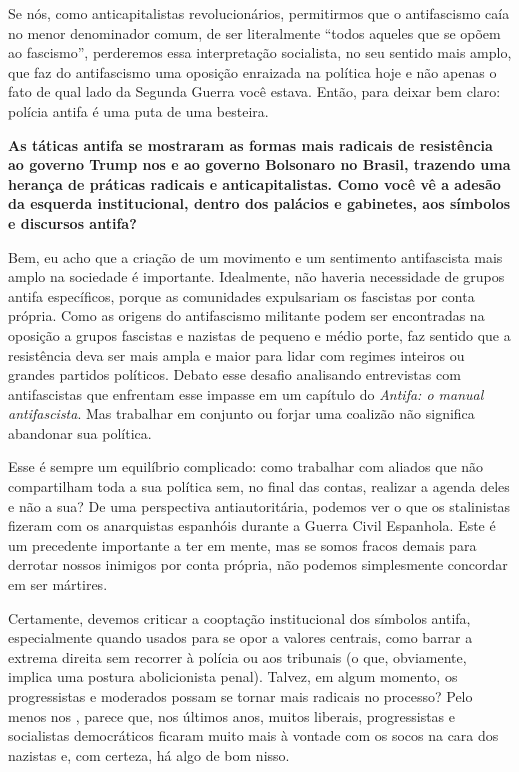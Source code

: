 Se nós, como anticapitalistas revolucionários, permitirmos que o antifascismo caía no menor denominador comum, de ser literalmente ``todos aqueles que se opõem ao fascismo'', perderemos essa interpretação socialista, no seu sentido mais amplo, que faz do antifascismo uma oposição enraizada na política hoje e não apenas o fato de qual lado da Segunda Guerra você estava. Então, para deixar bem claro: polícia antifa é uma puta de uma besteira. 

\bigskip

\noindent{}\textbf{As táticas antifa se mostraram as formas mais radicais de resistência ao governo Trump nos  e ao governo Bolsonaro no Brasil, trazendo uma herança de práticas radicais e anticapitalistas. Como você vê a adesão da esquerda institucional, dentro dos palácios e gabinetes, aos símbolos e discursos antifa?}
 
Bem, eu acho que a criação de um movimento e um sentimento antifascista mais amplo na sociedade é importante. Idealmente, não haveria necessidade de grupos antifa específicos, porque as comunidades expulsariam os fascistas por conta própria. Como as origens do antifascismo militante podem ser encontradas na oposição a grupos fascistas e nazistas de pequeno e médio porte, faz sentido que a resistência deva ser mais ampla e maior para lidar com regimes inteiros ou grandes partidos políticos. Debato esse desafio analisando entrevistas com antifascistas que enfrentam esse impasse em um capítulo do \emph{Antifa: o manual antifascista}. Mas trabalhar em conjunto ou forjar uma coalizão não significa abandonar sua política. 
 
Esse é sempre um equilíbrio complicado: como trabalhar com aliados que não compartilham toda a sua política sem, no final das contas, realizar a agenda deles e não a sua? De uma perspectiva antiautoritária, podemos ver o que os stalinistas fizeram com os anarquistas espanhóis durante a Guerra Civil Espanhola. Este é um precedente importante a ter em mente, mas se somos fracos demais para derrotar nossos inimigos por conta própria, não podemos simplesmente concordar em ser mártires. 

Certamente, devemos criticar a cooptação institucional dos símbolos antifa, especialmente quando usados para se opor a valores centrais, como barrar a extrema direita sem recorrer à polícia ou aos tribunais (o que, obviamente, implica uma postura abolicionista penal). Talvez, em algum momento, os progressistas e moderados possam se tornar mais radicais no processo? Pelo menos nos , parece que, nos últimos anos, muitos liberais, progressistas e socialistas democráticos ficaram muito mais à vontade com os socos na cara dos nazistas e, com certeza, há algo de bom nisso.

